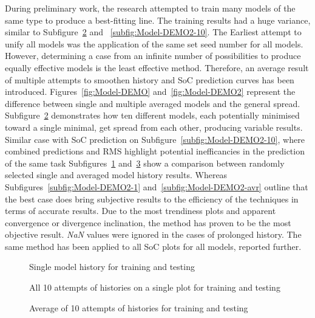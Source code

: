 %
During preliminary work, the research attempted to train many models of the same type to produce a best-fitting line.
The training results had a huge variance, similar to Subfigure~\ref{subfig:Model-DEMO-10} and ~\ref{subfig:Model-DEMO2-10}.
The Earliest attempt to unify all models was the application of the same set seed number for all models.
However, determining a case from an infinite number of possibilities to produce equally effective models is the least effective method.
Therefore, an average result of multiple attempts to smoothen history and SoC prediction curves has been introduced.
Figures~\ref{fig:Model-DEMO} and~\ref{fig:Model-DEMO2} represent the difference between single and multiple averaged models and the general spread.
Subfigure~\ref{subfig:Model-DEMO-10} demonstrates how ten different models, each potentially minimised toward a single minimal, get spread from each other, producing variable results.
Similar case with SoC prediction on Subfigure~\ref{subfig:Model-DEMO2-10}, where combined predictions and RMS highlight potential inefficancies in the prediction of the same task 
Subfigures~\ref{subfig:Model-DEMO-1} and~\ref{subfig:Model-DEMO-avr} show a comparison between randomly selected single and averaged model history results.
Whereas Subfigures~\ref{subfig:Model-DEMO2-1} and~\ref{subfig:Model-DEMO2-avr} outline that the best case does bring subjective results to the efficiency of the techniques in terms of accurate results.
Due to the most trendiness plots and apparent convergence or divergence inclination, the method has proven to be the most objective result.
\textit{NaN} values were ignored in the cases of prolonged history.
The same method has been applied to all SoC plots for all models, reported further.
\begin{figure*}[htbp]
  \centering
  \begin{subfigure}[b]{0.325\textwidth}
      \centering
      
      \caption{Single model history for training and testing}
      \label{subfig:Model-DEMO-1}
  \end{subfigure}
  \hfill
  \begin{subfigure}[b]{0.325\textwidth}
      \centering
      
      \caption{All 10 attempts of histories on a single plot for training and testing}
      \label{subfig:Model-DEMO-10}
  \end{subfigure}
  \hfill
  \begin{subfigure}[b]{0.325\textwidth}
      \centering
      
      \caption{Average of 10 attempts of histories for training and testing}
      \label{subfig:Model-DEMO-avr}
  \end{subfigure}
  \caption{History results averaging demonstration}
  \label{fig:Model-DEMO}
\end{figure*}
